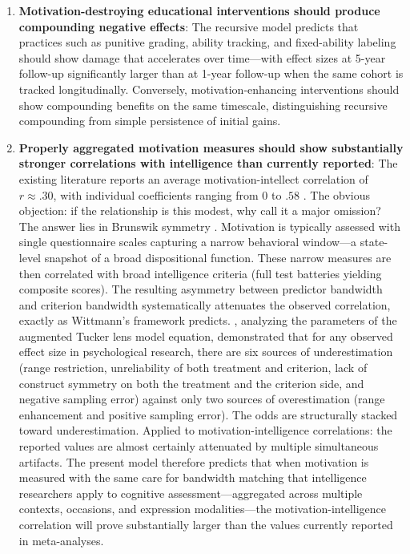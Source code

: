 \documentclass[12pt,a4paper]{article}
\begin{document}
\begin{enumerate}
\item \textbf{Motivation-destroying educational interventions should produce compounding negative effects}: The recursive model predicts that practices such as punitive grading, ability tracking, and fixed-ability labeling should show damage that accelerates over time---\hspace{0pt}with effect sizes at 5-year follow-up significantly larger than at 1-year follow-up when the same cohort is tracked longitudinally. Conversely, motivation-enhancing interventions should show compounding benefits on the same timescale, distinguishing recursive compounding from simple persistence of initial gains.

\item \textbf{Properly aggregated motivation measures should show substantially stronger correlations with intelligence than currently reported}: The existing literature reports an average motivation-intellect correlation of $r \approx .30$, with individual coefficients ranging from $0$ to $.58$ \citep{vonStummAckerman2013}. The obvious objection: if the relationship is this modest, why call it a major omission? The answer lies in Brunswik symmetry \citep{Wittmann1988,WittmannKlumb2006}. Motivation is typically assessed with single questionnaire scales capturing a narrow behavioral window---\hspace{0pt}a state-level snapshot of a broad dispositional function. These narrow measures are then correlated with broad intelligence criteria (full test batteries yielding composite scores). The resulting asymmetry between predictor bandwidth and criterion bandwidth systematically attenuates the observed correlation, exactly as Wittmann's framework predicts. \citet{WittmannKlumb2006}, analyzing the parameters of the augmented Tucker lens model equation, demonstrated that for any observed effect size in psychological research, there are six sources of underestimation (range restriction, unreliability of both treatment and criterion, lack of construct symmetry on both the treatment and the criterion side, and negative sampling error) against only two sources of overestimation (range enhancement and positive sampling error). The odds are structurally stacked toward underestimation. Applied to motivation-intelligence correlations: the reported values are almost certainly attenuated by multiple simultaneous artifacts. The present model therefore predicts that when motivation is measured with the same care for bandwidth matching that intelligence researchers apply to cognitive assessment---\hspace{0pt}aggregated across multiple contexts, occasions, and expression modalities---\hspace{0pt}the motivation-intelligence correlation will prove substantially larger than the values currently reported in meta-analyses.


\end{enumerate}
\end{document}
